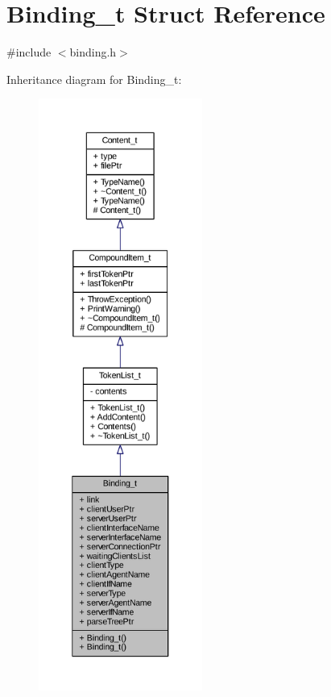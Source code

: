 \hypertarget{struct_binding__t}{}\section{Binding\+\_\+t Struct Reference}
\label{struct_binding__t}


{\ttfamily \#include $<$binding.\+h$>$}



Inheritance diagram for Binding\+\_\+t\+:
\nopagebreak
\begin{figure}[H]
\begin{center}
\leavevmode
\includegraphics[height=550pt]{struct_binding__t__inherit__graph}
\end{center}
\end{figure}


